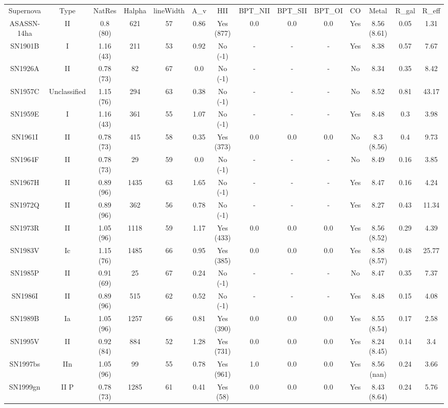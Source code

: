 \begin{table}
\begin{tabular}{cccccccccccccc}
Supernova & Type & NatRes & Halpha & lineWidth & A_v & HII & BPT_NII & BPT_SII & BPT_OI & CO & Metal & R_gal & R_eff \\
ASASSN-14ha & II & 0.8 (80) & 621 & 57 & 0.86 & Yes (877) & 0.0 & 0.0 & 0.0 & Yes & 8.56 (8.61) & 0.05 & 1.31 \\
SN1901B & I & 1.16 (43) & 211 & 53 & 0.92 & No (-1) & - & - & - & Yes & 8.38 & 0.57 & 7.67 \\
SN1926A & II & 0.78 (73) & 82 & 67 & 0.0 & No (-1) & - & - & - & No & 8.34 & 0.35 & 8.42 \\
SN1957C & Unclassified & 1.15 (76) & 294 & 63 & 0.38 & No (-1) & - & - & - & No & 8.52 & 0.81 & 43.17 \\
SN1959E & I & 1.16 (43) & 361 & 55 & 1.07 & No (-1) & - & - & - & Yes & 8.48 & 0.3 & 3.98 \\
SN1961I & II & 0.78 (73) & 415 & 58 & 0.35 & Yes (373) & 0.0 & 0.0 & 0.0 & No & 8.3 (8.56) & 0.4 & 9.73 \\
SN1964F & II & 0.78 (73) & 29 & 59 & 0.0 & No (-1) & - & - & - & No & 8.49 & 0.16 & 3.85 \\
SN1967H & II & 0.89 (96) & 1435 & 63 & 1.65 & No (-1) & - & - & - & Yes & 8.47 & 0.16 & 4.24 \\
SN1972Q & II & 0.89 (96) & 362 & 56 & 0.78 & No (-1) & - & - & - & Yes & 8.27 & 0.43 & 11.34 \\
SN1973R & II & 1.05 (96) & 1118 & 59 & 1.17 & Yes (433) & 0.0 & 0.0 & 0.0 & Yes & 8.56 (8.52) & 0.29 & 4.39 \\
SN1983V & Ic & 1.15 (76) & 1485 & 66 & 0.95 & Yes (385) & 0.0 & 0.0 & 0.0 & Yes & 8.58 (8.57) & 0.48 & 25.77 \\
SN1985P & II & 0.91 (69) & 25 & 67 & 0.24 & No (-1) & - & - & - & No & 8.47 & 0.35 & 7.37 \\
SN1986I & II & 0.89 (96) & 515 & 62 & 0.52 & No (-1) & - & - & - & Yes & 8.48 & 0.15 & 4.08 \\
SN1989B & Ia & 1.05 (96) & 1257 & 66 & 0.81 & Yes (390) & 0.0 & 0.0 & 0.0 & Yes & 8.55 (8.54) & 0.17 & 2.58 \\
SN1995V & II & 0.92 (84) & 884 & 52 & 1.28 & Yes (731) & 0.0 & 0.0 & 0.0 & Yes & 8.24 (8.45) & 0.14 & 3.4 \\
SN1997bs & IIn & 1.05 (96) & 99 & 55 & 0.78 & Yes (961) & 1.0 & 0.0 & 0.0 & Yes & 8.56 (nan) & 0.24 & 3.66 \\
SN1999gn & II P & 0.78 (73) & 1285 & 61 & 0.41 & Yes (58) & 0.0 & 0.0 & 0.0 & Yes & 8.43 (8.64) & 0.24 & 5.76 \\

\end{tabular}
\end{table}
